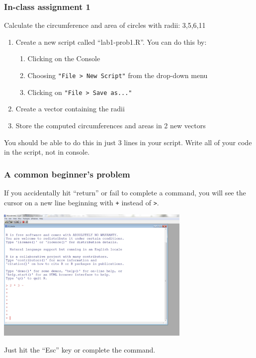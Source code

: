 \documentclass[color=usenames,dvipsnames]{beamer}\usepackage[]{graphicx}\usepackage[]{color}
\begin{document}
\begin{frame}[fragile]
  \frametitle{In-class assignment 1}
  {Calculate the circumference and area of circles with radii: 3,5,6,11} \\
  \pause
  \vspace{0.5cm}
  \begin{enumerate}[\bf (1)]
    \item Create a new script called ``lab1-prob1.R''. You can do this by:
      \begin{enumerate}[i]
        \item Clicking on the Console
        \item Choosing \verb_"File > New Script"_ from the drop-down menu
        \item Clicking on \verb_"File > Save as..."_
      \end{enumerate}
    \item Create a vector containing the radii
    \item Store the computed circumferences and areas in 2 new vectors
  \end{enumerate}
  \vspace{1cm}
  \centering
  \alert{You should be able to do this in just 3 lines in your
    script. Write all of your code in the script, not in console. \\}
\end{frame}




\begin{frame}[fragile]
  \frametitle{A common beginner's problem}
  If you accidentally hit ``return'' or fail to complete a command, you
  will see the cursor on a new line beginning with \verb_+_ instead of
  \verb+>+. \\
  \pause
  \begin{center}
    \includegraphics[width=0.7\textwidth]{figs/plus-prompt}
  \end{center}
  \pause
  Just hit the ``Esc'' key or complete the command.
\end{frame}
\end{document}
